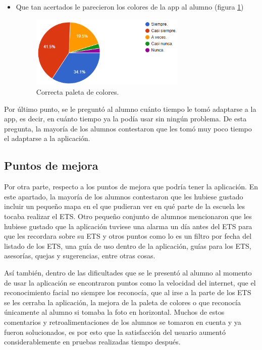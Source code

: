 \begin{itemize}
	\item Que tan acertados le parecieron los colores de la app al alumno (figura \ref{fig:UCA})\begin{figure}[H]
		\centering
		\includegraphics[width=0.7\textwidth]{images/FRF.png}
		\caption{Correcta paleta de colores.}
		\label{fig:UCA}
	\end{figure}
	
\end{itemize} 

Por último punto, se le preguntó al alumno cuánto tiempo le tomó adaptarse a la app, es decir, en cuánto tiempo ya la podía usar sin ningún problema. De esta pregunta, la mayoría de los alumnos contestaron que les tomó muy poco tiempo el adaptarse a la aplicación.

\subsection{Puntos de mejora}
Por otra parte, respecto a los puntos de mejora que podría tener la aplicación.
En este apartado, la mayoría de los alumnos contestaron que les hubiese gustado incluir un pequeño mapa en el que pudieran ver en qué parte de la escuela les tocaba realizar el ETS. Otro pequeño conjunto de alumnos mencionaron que les hubiese gustado que la aplicación tuviese una alarma un día antes del ETS para que les recordara sobre su ETS y otros puntos como lo es un filtro por fecha del listado de los ETS, una guía de uso dentro de la aplicación, guías para los ETS, asesorías, quejas y sugerencias, entre otras cosas.

Así también, dentro de las dificultades que se le presentó al alumno al momento de usar la aplicación se encontraron puntos como la velocidad del internet, que el reconocimiento facial no siempre los reconocía, que al irse a la parte de los ETS se les cerraba la aplicación, la mejora de la paleta de colores o que reconocía únicamente al alumno si tomaba la foto en horizontal. 
Muchos de estos comentarios y retroalimentaciones de los alumnos se tomaron en cuenta y ya fueron solucionados, es por esto que la satisfacción del usuario aumentó considerablemente en pruebas realizadas tiempo después.
